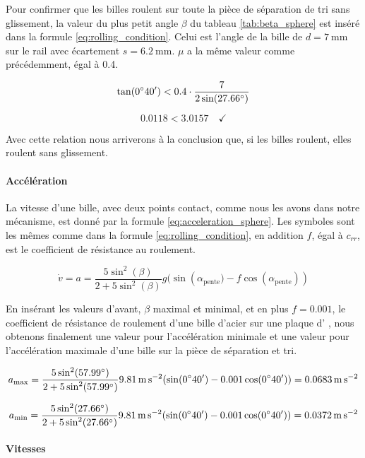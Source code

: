 Pour confirmer que les billes roulent sur toute la pièce de séparation de tri sans glissement, la valeur du plus petit angle $\beta$ du tableau \ref{tab:beta_sphere} est inséré dans la formule \ref{eq:rolling_condition}. Celui est l'angle de la bille de $d = \SI{7}{\mm}$ sur le rail avec écartement $s = \SI{6.2}{\mm}$. $\mu$ a la même valeur comme précédemment, égal à \num{0.4}.

\[\sisetup{add-arc-degree-zero} \tan(\ang{;40;}) < \num{0.4} \cdot \frac{7}{2\sin(\ang{27.66})}\]

\[\num{0.0118} < \num{3.0157} \quad \checkmark\]

Avec cette relation nous arriverons à la conclusion que, si les billes roulent, elles roulent sans glissement.

\paragraph{Accélération}
La vitesse d'une bille, avec deux points contact, comme nous les avons dans notre mécanisme, est donné par la formule \ref{eq:acceleration_sphere}. Les symboles sont les mêmes comme dans la formule \ref{eq:rolling_condition}, en addition $f$, égal à $c_{rr}$, est le coefficient de résistance au roulement.

\begin{equation}
    \dot{v} = a = \frac{5\sin^{2}(\beta)}{2+5\sin^{2}(\beta)} g(\sin({\alpha_{\text{pente}}) - f\cos(\alpha_{\text{pente}})})
    \label{eq:acceleration_sphere}
\end{equation}

En insérant les valeurs d'avant, $\beta$ maximal et minimal, et en plus $f = \num{0.001}$, le coefficient de résistance de roulement d'une bille d'acier sur une plaque d'%
, nous obtenons finalement une valeur pour l'accélération minimale et une valeur pour l'accélération maximale d'une bille sur la pièce de séparation et tri.

\[\sisetup{add-arc-degree-zero}
a\textsubscript{max} = \frac{5\sin^{2}(\ang{57.99})}{2+5\sin^{2}(\ang{57.99})} \SI{9.81}{\metre\per\second\squared}(\sin(\ang{;40;}) - \num{0.001}\cos(\ang{;40;})) = \SI{0.0683}{\m\per\s\squared}\]

\[\sisetup{add-arc-degree-zero}
a\textsubscript{min} = \frac{5\sin^{2}(\ang{27.66})}{2+5\sin^{2}(\ang{27.66})} \SI{9.81}{\metre\per\second\squared}(\sin(\ang{;40;}) - \num{0.001}\cos(\ang{;40;})) = \SI{0.0372}{\m\per\s\squared}\]


\paragraph{Vitesses}

